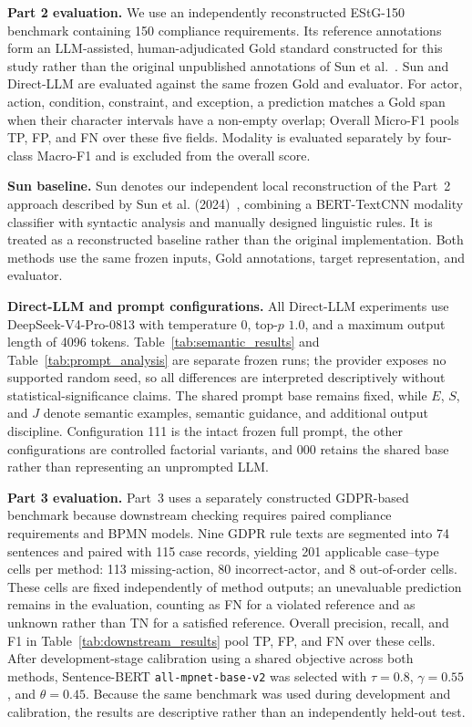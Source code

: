 \documentclass[conference]{IEEEtran}
\begin{document}
\textbf{Part 2 evaluation.} We use an independently reconstructed EStG-150 benchmark containing 150 compliance requirements. Its reference annotations form an LLM-assisted, human-adjudicated Gold standard constructed for this study rather than the original unpublished annotations of Sun et al.~\cite{sun2024design}. Sun and Direct-LLM are evaluated against the same frozen Gold and evaluator. For actor, action, condition, constraint, and exception, a prediction matches a Gold span when their character intervals have a non-empty overlap; Overall Micro-F1 pools TP, FP, and FN over these five fields. Modality is evaluated separately by four-class Macro-F1 and is excluded from the overall score.

\textbf{Sun baseline.} Sun denotes our independent local reconstruction of the Part~2 approach described by Sun et al. (2024)~\cite{sun2024design}, combining a BERT-TextCNN modality classifier with syntactic analysis and manually designed linguistic rules. It is treated as a reconstructed baseline rather than the original implementation. Both methods use the same frozen inputs, Gold annotations, target representation, and evaluator.

\textbf{Direct-LLM and prompt configurations.} All Direct-LLM experiments use DeepSeek-V4-Pro-0813 with temperature \(0\), top-\(p\) \(1.0\), and a maximum output length of 4096 tokens. Table~\ref{tab:semantic_results} and Table~\ref{tab:prompt_analysis} are separate frozen runs; the provider exposes no supported random seed, so all differences are interpreted descriptively without statistical-significance claims. The shared prompt base remains fixed, while \(E\), \(S\), and \(J\) denote semantic examples, semantic guidance, and additional output discipline. Configuration 111 is the intact frozen full prompt, the other configurations are controlled factorial variants, and 000 retains the shared base rather than representing an unprompted LLM.

\textbf{Part 3 evaluation.} Part~3 uses a separately constructed GDPR-based benchmark because downstream checking requires paired compliance requirements and BPMN models. Nine GDPR rule texts are segmented into 74 sentences and paired with 115 case records, yielding 201 applicable case--type cells per method: 113 missing-action, 80 incorrect-actor, and 8 out-of-order cells. These cells are fixed independently of method outputs; an unevaluable prediction remains in the evaluation, counting as FN for a violated reference and as unknown rather than TN for a satisfied reference. Overall precision, recall, and F1 in Table~\ref{tab:downstream_results} pool TP, FP, and FN over these cells. After development-stage calibration using a shared objective across both methods, Sentence-BERT \texttt{all-mpnet-base-v2} was selected with \(\tau=0.8\), \(\gamma=0.55\), and \(\theta=0.45\). Because the same benchmark was used during development and calibration, the results are descriptive rather than an independently held-out test.
\end{document}
